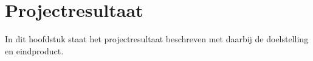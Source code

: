 \chapter{Projectresultaat}
In dit hoofdstuk staat het projectresultaat beschreven met daarbij de doelstelling en eindproduct.
% 


